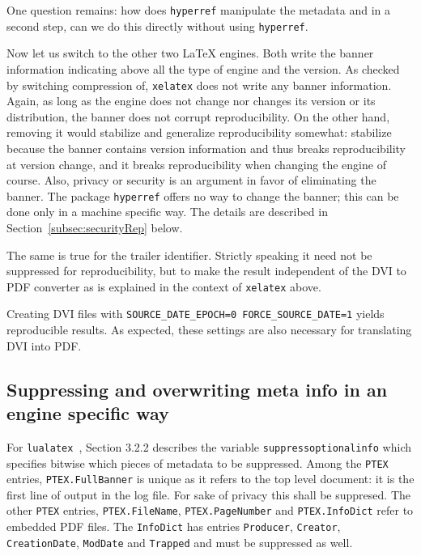 \documentclass[a4paper, english]{article}%
\newcommand{\lualatex}{\texttt{lualatex}}
\newcommand{\xelatex}{\texttt{xelatex}}
\begin{document}
One question remains: how does \texttt{hyperref} manipulate the metadata 
and in a second step, can we do this directly without using \texttt{hyperref}. 
\medskip


Now let us switch to the other two \LaTeX{} engines. 
Both write the banner information indicating 
above all the type of engine and the version. 
As checked by switching compression of, \xelatex{} does not write any banner information. 
Again, as long as the engine does not change nor changes its version or its distribution, 
the banner does not corrupt reproducibility. 
On the other hand, removing it would stabilize and generalize reproducibility somewhat: 
stabilize because the banner contains version information 
and thus breaks reproducibility at version change, 
and it breaks reproducibility when changing the engine of course. 
Also, privacy or security is an argument in favor of eliminating the banner. 
The package \texttt{hyperref} offers no way to change the banner; 
this can be done only in a machine specific way. 
The details are described in Section~\ref{subsec:securityRep} below. 

The same is true for the trailer identifier. 
Strictly speaking it need not be suppressed for reproducibility, 
but to make the result independent of the DVI to PDF converter 
as is explained in the context of \xelatex{} above. 

Creating DVI files with \texttt{SOURCE\_DATE\_EPOCH=0 FORCE\_SOURCE\_DATE=1} 
yields reproducible results. 
As expected, these settings are also necessary for translating DVI into PDF\@. 

\subsection{Suppressing and overwriting meta info in an engine specific way }

For \lualatex{}~\cite{LuaTexRef24}, Section 3.2.2 describes the variable \texttt{suppressoptionalinfo} 
which specifies bitwise which pieces of metadata to be suppressed. 
Among the \texttt{PTEX} entries, \texttt{PTEX.FullBanner} is unique as it refers to the top level document: 
it is the first line of output in the log file. 
For sake of privacy this shall be suppresed. 
The other \texttt{PTEX} entries, 
\texttt{PTEX.FileName}, \texttt{PTEX.PageNumber} and \texttt{PTEX.InfoDict} 
refer to embedded PDF files. 
The \texttt{InfoDict} has entries 
\texttt{Producer}, \texttt{Creator}, \texttt{CreationDate}, \texttt{ModDate} 
and \texttt{Trapped} and must be suppressed as well. 
\end{document}
